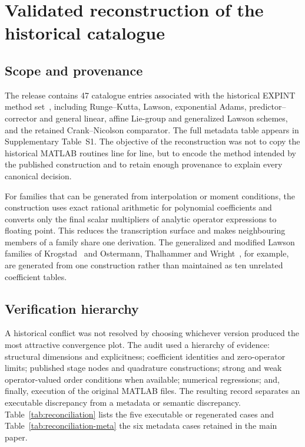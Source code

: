 \section{Validated reconstruction of the historical catalogue}\label{sec:catalogue}

\subsection{Scope and provenance}

The release contains 47 catalogue entries associated with the historical
EXPINT method set~\cite{BerlandSkaflestadWright2007}, including Runge--Kutta,
Lawson, exponential Adams, predictor--corrector and general linear, affine
Lie-group and generalized Lawson schemes, and the retained Crank--Nicolson
comparator.  The full metadata table appears in Supplementary Table~S1.  The
objective of the reconstruction was not to copy the historical MATLAB routines
line for line, but to encode the method intended by the published construction
and to retain enough provenance to explain every canonical decision.

For families that can be generated from interpolation or moment conditions,
the construction uses exact rational arithmetic for polynomial coefficients
and converts only the final scalar multipliers of analytic operator expressions
to floating point.  This reduces the transcription surface and makes
neighbouring members of a family share one derivation.  The generalized and
modified Lawson families of Krogstad~\cite{Krogstad2005} and Ostermann,
Thalhammer and Wright~\cite{OstermannThalhammerWright2006}, for example, are
generated from one construction rather than maintained as ten unrelated
coefficient tables.

\subsection{Verification hierarchy}

A historical conflict was not resolved by choosing whichever version produced
the most attractive convergence plot.  The audit used a hierarchy of evidence:
structural dimensions and explicitness; coefficient identities and zero-operator
limits; published stage nodes and quadrature constructions; strong and weak
operator-valued order conditions when available; numerical regressions; and,
finally, execution of the original MATLAB files.  The resulting record
separates an executable discrepancy from a metadata or semantic discrepancy.
Table~\ref{tab:reconciliation} lists the five executable or regenerated cases
and Table~\ref{tab:reconciliation-meta} the six metadata cases retained in the
main paper.

